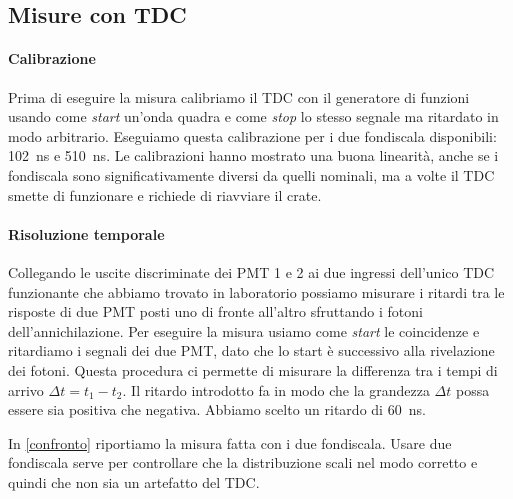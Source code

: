 \subsection{Misure con TDC}

\paragraph{Calibrazione}

Prima di eseguire la misura calibriamo il TDC con il generatore di funzioni usando come \emph{start} un'onda quadra e come \emph{stop} lo stesso segnale ma ritardato in modo arbitrario.
Eseguiamo questa calibrazione per i due fondiscala disponibili: \SI{102}{ns} e \SI{510}{ns}.
Le calibrazioni hanno mostrato una buona linearità,
anche se i fondiscala sono significativamente diversi da quelli nominali,
ma a volte il TDC smette di funzionare e richiede di riavviare il crate.

\paragraph{Risoluzione temporale}

Collegando le uscite discriminate dei PMT 1 e 2 ai due ingressi dell'unico TDC funzionante
che abbiamo trovato in laboratorio possiamo misurare i ritardi tra le risposte di due PMT posti uno di fronte all'altro sfruttando i fotoni dell'annichilazione. Per eseguire la misura usiamo come \emph{start} le coincidenze e ritardiamo i segnali dei due PMT, dato che lo start è successivo alla rivelazione dei fotoni. Questa procedura ci permette di misurare la differenza tra i tempi di arrivo $\Delta t=t_1-t_2$. Il ritardo introdotto fa in modo che la grandezza $\Delta t$ possa essere sia positiva che negativa. Abbiamo scelto un ritardo di \SI{60}{ns}.


In \autoref{confronto} riportiamo la misura fatta con i due fondiscala.
Usare due fondiscala serve per controllare che la distribuzione scali nel modo corretto
e quindi che non sia un artefatto del TDC.

